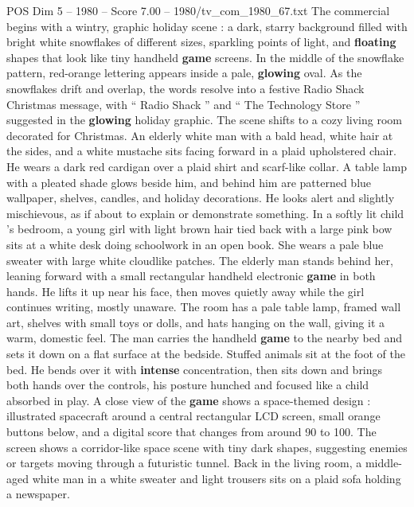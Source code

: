 \begin{textsample}{POS Dim 5 – 1980 – Score 7.00 – 1980/tv\_com\_1980\_67.txt}  \label{ex:f5_pos_033}
The commercial begins with a wintry, graphic holiday scene : a dark, starry background filled with bright white snowflakes of different sizes, sparkling points of light, and \textbf{floating} shapes that look like tiny handheld \textbf{game} screens.
In the middle of the snowflake pattern, red-orange lettering appears inside a pale, \textbf{glowing} oval.
As the snowflakes drift and overlap, the words resolve into a festive Radio Shack Christmas message, with “ Radio Shack ” and “ The Technology Store ” suggested in the \textbf{glowing} holiday graphic.
The scene shifts to a cozy living room decorated for Christmas.
An elderly white man with a bald head, white hair at the sides, and a white mustache sits facing forward in a plaid upholstered chair.
He wears a dark red cardigan over a plaid shirt and scarf-like collar.
A table lamp with a pleated shade glows beside him, and behind him are patterned blue wallpaper, shelves, candles, and holiday decorations.
He looks alert and slightly mischievous, as if about to explain or demonstrate something.
In a softly lit child ’s bedroom, a young girl with light brown hair tied back with a large pink bow sits at a white desk doing schoolwork in an open book.
She wears a pale blue sweater with large white cloudlike patches.
The elderly man stands behind her, leaning forward with a small rectangular handheld electronic \textbf{game} in both hands.
He lifts it up near his face, then moves quietly away while the girl continues writing, mostly unaware.
The room has a pale table lamp, framed wall art, shelves with small toys or dolls, and hats hanging on the wall, giving it a warm, domestic feel.
The man carries the handheld \textbf{game} to the nearby bed and sets it down on a flat surface at the bedside.
Stuffed animals sit at the foot of the bed.
He bends over it with \textbf{intense} concentration, then sits down and brings both hands over the controls, his posture hunched and focused like a child absorbed in play.
A close view of the \textbf{game} shows a space-themed design : illustrated spacecraft around a central rectangular LCD screen, small orange buttons below, and a digital score that changes from around 90 to 100.
The screen shows a corridor-like space scene with tiny dark shapes, suggesting enemies or targets moving through a futuristic tunnel.
Back in the living room, a middle-aged white man in a white sweater and light trousers sits on a plaid sofa holding a newspaper.

\end{textsample}
